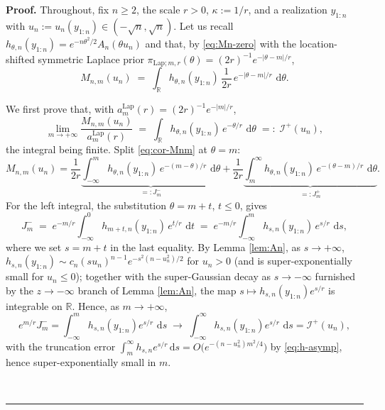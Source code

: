 \documentclass{article}%
\newenvironment{proof}[1][Proof]{\noindent\textbf{#1.} }{\ \rule{0.5em}{0.5em}}
\newcommand{\R}{\mathbb{R}}
\newcommand{\dd}{\,\mathrm{d}}
\begin{document}
\begin{proof}
    Throughout, fix \(n\ge 2\), the scale \(r>0\), \(\kappa:=1/r\), and a
realization \(y_{1:n}\) with \(u_n:=u_n(y_{1:n})\in(-\sqrt n,\sqrt n)\).
Let us recall \(h_{\theta,n}(y_{1:n})=e^{-n\theta^2/2}A_n(\theta u_n)\) and
that, by \eqref{eq:Mn-zero} with the location-shifted symmetric Laplace prior
\(\pi_{\mathrm{Lap};m,r}(\theta)=(2r)^{-1}e^{-|\theta-m|/r}\),
\begin{equation}\label{eq:cor-Mnm}
   M_{n,m}(u_n)
   \;=\;\int_{\R} h_{\theta,n}(y_{1:n})\,
        \frac{1}{2r}\,e^{-|\theta-m|/r}\,\dd\theta .
\end{equation}

We first prove that, with \(a_m^{\mathrm{Lap}}(r)=(2r)^{-1}e^{-|m|/r}\),
\begin{equation}\label{eq:cor-plateau}
   \lim_{m\to+\infty}\frac{M_{n,m}(u_n)}{a_m^{\mathrm{Lap}}(r)}
   \;=\;\int_{\R} h_{\theta,n}(y_{1:n})\,e^{-\theta/r}\,\dd\theta
   \;=:\;\mathcal I^{+}(u_n),
\end{equation}
the integral being finite. Split \eqref{eq:cor-Mnm} at \(\theta=m\):
\[
   M_{n,m}(u_n)
   =\frac1{2r}\underbrace{\int_{-\infty}^{m}
        h_{\theta,n}(y_{1:n})\,e^{-(m-\theta)/r}\,\dd\theta}_{=:J^-_m}
   +\frac1{2r}\underbrace{\int_{m}^{\infty}
        h_{\theta,n}(y_{1:n})\,e^{-(\theta-m)/r}\,\dd\theta}_{=:J^+_m}.
\]
For the left integral, the substitution \(\theta=m+t\), \(t\le 0\), gives
\[
   J^-_m \;=\; e^{-m/r}\int_{-\infty}^{0}
       h_{m+t,n}(y_{1:n})\,e^{t/r}\,\dd t
   \;=\; e^{-m/r}\int_{-\infty}^{m}
       h_{s,n}(y_{1:n})\,e^{s/r}\,\dd s ,
\]
where we set \(s=m+t\) in the last equality. By Lemma \ref{lem:An}, as
\(s\to+\infty\), \(h_{s,n}(y_{1:n})\sim c_n (s u_n)^{n-1}
e^{-s^2(n-u_n^2)/2}\) for \(u_n>0\) (and is super-exponentially small
for \(u_n\le 0\)); together with the super-Gaussian decay as
\(s\to-\infty\) furnished by the \(z\to-\infty\) branch of Lemma \ref{lem:An}, the map \(s\mapsto h_{s,n}(y_{1:n})e^{s/r}\) is integrable on \(\R\). Hence, as \(m\to+\infty\),
\begin{equation}\label{eq:cor-Jminus}
   e^{m/r}J^-_m
   =\int_{-\infty}^{m}h_{s,n}(y_{1:n})e^{s/r}\,\dd s
   \;\longrightarrow\;
   \int_{-\infty}^{\infty}h_{s,n}(y_{1:n})e^{s/r}\,\dd s
   =\mathcal I^{+}(u_n),
\end{equation}
with the truncation error
\(\int_m^\infty h_{s,n}e^{s/r}\dd s = O\!\big(e^{-(n-u_n^2)m^2/4}\big)\)
by \eqref{eq:h-asymp}, hence super-exponentially small in
\(m\).


\end{proof}
\end{document}

